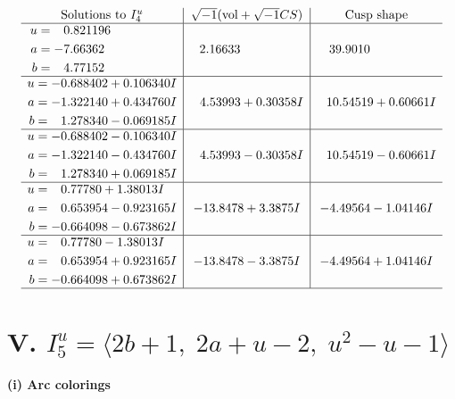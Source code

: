 \documentclass[1p]{elsarticle_modified}
\theoremstyle{definition}
\newcommand{\I}{\sqrt{-1}}
\begin{document}
$$\begin{array}{c|c|c}  
\text{Solutions to }I^u_{4}& \I (\text{vol} + \sqrt{-1}CS) & \text{Cusp shape}\\
 \hline 
\begin{aligned}
u &= \phantom{-}0.821196\phantom{ +0.000000I} \\
a &= -7.66362\phantom{ +0.000000I} \\
b &= \phantom{-}4.77152\phantom{ +0.000000I}\end{aligned}
 & \phantom{-}2.16633\phantom{ +0.000000I} & \phantom{-}39.9010\phantom{ +0.000000I} \\ \hline\begin{aligned}
u &= -0.688402 + 0.106340 I \\
a &= -1.322140 + 0.434760 I \\
b &= \phantom{-}1.278340 - 0.069185 I\end{aligned}
 & \phantom{-}4.53993 + 0.30358 I & \phantom{-}10.54519 + 0.60661 I \\ \hline\begin{aligned}
u &= -0.688402 - 0.106340 I \\
a &= -1.322140 - 0.434760 I \\
b &= \phantom{-}1.278340 + 0.069185 I\end{aligned}
 & \phantom{-}4.53993 - 0.30358 I & \phantom{-}10.54519 - 0.60661 I \\ \hline\begin{aligned}
u &= \phantom{-}0.77780 + 1.38013 I \\
a &= \phantom{-}0.653954 - 0.923165 I \\
b &= -0.664098 - 0.673862 I\end{aligned}
 & -13.8478 + 3.3875 I & -4.49564 - 1.04146 I \\ \hline\begin{aligned}
u &= \phantom{-}0.77780 - 1.38013 I \\
a &= \phantom{-}0.653954 + 0.923165 I \\
b &= -0.664098 + 0.673862 I\end{aligned}
 & -13.8478 - 3.3875 I & -4.49564 + 1.04146 I\\
 \hline 
 \end{array}$$\newpage\newpage\renewcommand{\arraystretch}{1}
\centering \section*{V. $I^u_{5}= \langle 2 b+1,\;2 a+u-2,\;u^2- u-1 \rangle$}
\flushleft \textbf{(i) Arc colorings}\\
\end{document}
